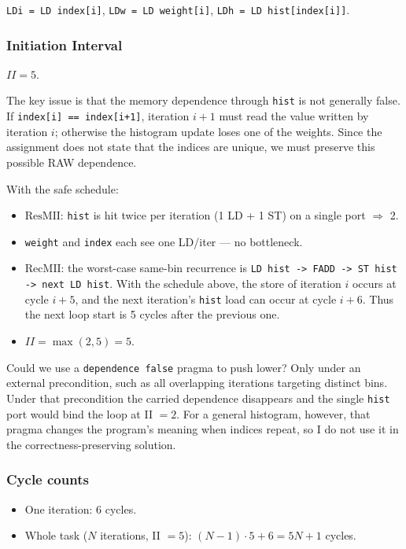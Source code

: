 \documentclass[11pt,a4paper]{article}
\begin{document}
\noindent\texttt{LDi = LD index[i]}, \texttt{LDw = LD weight[i]}, \texttt{LDh = LD hist[index[i]]}.

\subsubsection*{Initiation Interval}

$II = 5$.

The key issue is that the memory dependence through \texttt{hist} is not generally false. If \texttt{index[i] == index[i+1]}, iteration $i+1$ must read the value written by iteration $i$; otherwise the histogram update loses one of the weights. Since the assignment does not state that the indices are unique, we must preserve this possible RAW dependence.

With the safe schedule:
\begin{itemize}[noitemsep]
  \item $\mathrm{ResMII}$: \texttt{hist} is hit twice per iteration (1 LD + 1 ST) on a single port $\Rightarrow$ 2.
  \item \texttt{weight} and \texttt{index} each see one LD/iter --- no bottleneck.
  \item $\mathrm{RecMII}$: the worst-case same-bin recurrence is \texttt{LD hist -> FADD -> ST hist -> next LD hist}. With the schedule above, the store of iteration $i$ occurs at cycle $i+5$, and the next iteration's \texttt{hist} load can occur at cycle $i+6$. Thus the next loop start is 5 cycles after the previous one.
  \item $II = \max(2, 5) = 5$.
\end{itemize}

Could we use a \texttt{dependence false} pragma to push lower? Only under an external precondition, such as all overlapping iterations targeting distinct bins. Under that precondition the carried dependence disappears and the single \texttt{hist} port would bind the loop at II $=2$. For a general histogram, however, that pragma changes the program's meaning when indices repeat, so I do not use it in the correctness-preserving solution.

\subsubsection*{Cycle counts}

\begin{itemize}[noitemsep]
  \item One iteration: 6 cycles.
  \item Whole task ($N$ iterations, II $=5$): $(N-1)\cdot 5 + 6 = 5N + 1$ cycles.
\end{itemize}
\end{document}
